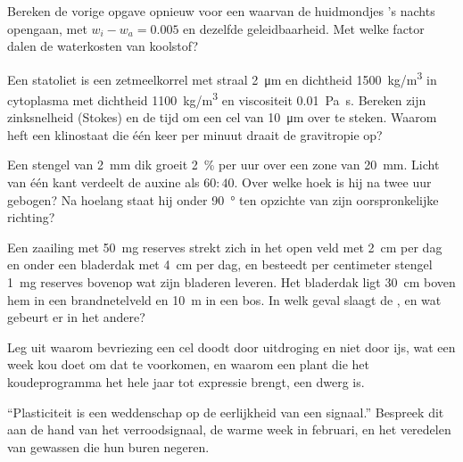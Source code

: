 \begin{exercise}[$\star\star$]\label{exo:b2:plant-plasticity:7}
Bereken de vorige opgave opnieuw voor een  waarvan de huidmondjes
's nachts opengaan, met $w_i - w_a = 0.005$ en dezelfde geleidbaarheid. Met
welke factor dalen de waterkosten van koolstof?
\end{exercise}

\begin{exercise}[$\star\star$]\label{exo:b2:plant-plasticity:8}
Een statoliet is een zetmeelkorrel met straal \qty{2}{\micro m} en dichtheid
\qty{1500}{kg/m^3} in cytoplasma met dichtheid \qty{1100}{kg/m^3} en
viscositeit \qty{0.01}{Pa.s}. Bereken zijn zinksnelheid (Stokes) en de tijd
om een cel van \qty{10}{\micro m} over te steken. Waarom heft een klinostaat
die één keer per minuut draait de gravitropie op?
\end{exercise}

\begin{exercise}[$\star\star$]\label{exo:b2:plant-plasticity:9}
Een stengel van \qty{2}{mm} dik groeit \qty{2}{\%} per uur over een zone van
\qty{20}{mm}. Licht van één kant verdeelt de auxine als $60 : 40$.
Over welke hoek is hij na twee uur gebogen? Na hoelang staat hij onder
\qty{90}{\degree} ten opzichte van zijn oorspronkelijke richting?
\end{exercise}

\begin{exercise}[$\star\star\star$]\label{exo:b2:plant-plasticity:10}
Een zaailing met \qty{50}{mg} reserves strekt zich in het open veld met
\qty{2}{cm} per dag en onder een bladerdak met \qty{4}{cm} per dag, en
besteedt per centimeter stengel \qty{1}{mg} reserves bovenop wat zijn
bladeren leveren. Het bladerdak ligt \qty{30}{cm} boven hem in een
brandnetelveld en \qty{10}{m} in een bos. In welk geval slaagt de
, en wat gebeurt er in het andere?
\end{exercise}

\begin{exercise}[$\star\star\star$]\label{exo:b2:plant-plasticity:11}
Leg uit waarom bevriezing een cel doodt door uitdroging en niet door ijs, wat
een week kou doet om dat te voorkomen, en waarom een plant die het
koudeprogramma het hele jaar tot expressie brengt, een dwerg is.
\end{exercise}

\begin{exercise}[$\star\star\star$]\label{exo:b2:plant-plasticity:12}
``Plasticiteit is een weddenschap op de eerlijkheid van een signaal.''
Bespreek dit aan de hand van het verroodsignaal, de warme week in februari,
en het veredelen van gewassen die hun buren negeren.
\end{exercise}

